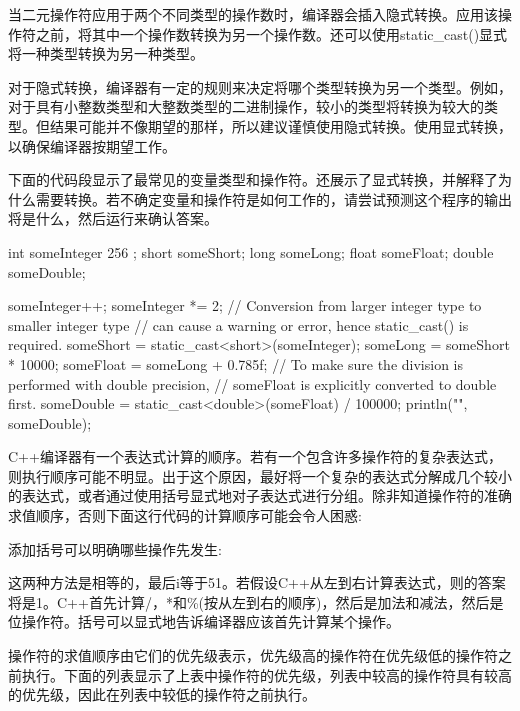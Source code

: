当二元操作符应用于两个不同类型的操作数时，编译器会插入隐式转换。应用该操作符之前，将其中一个操作数转换为另一个操作数。还可以使用static\_cast()显式将一种类型转换为另一种类型。

对于隐式转换，编译器有一定的规则来决定将哪个类型转换为另一个类型。例如，对于具有小整数类型和大整数类型的二进制操作，较小的类型将转换为较大的类型。但结果可能并不像期望的那样，所以建议谨慎使用隐式转换。使用显式转换，以确保编译器按期望工作。

下面的代码段显示了最常见的变量类型和操作符。还展示了显式转换，并解释了为什么需要转换。若不确定变量和操作符是如何工作的，请尝试预测这个程序的输出将是什么，然后运行来确认答案。

\begin{cpp}
int someInteger { 256 };
short someShort;
long someLong;
float someFloat;
double someDouble;

someInteger++;
someInteger *= 2;
// Conversion from larger integer type to smaller integer type
// can cause a warning or error, hence static_cast() is required.
someShort = static_cast<short>(someInteger);
someLong = someShort * 10000;
someFloat = someLong + 0.785f;
// To make sure the division is performed with double precision,
// someFloat is explicitly converted to double first.
someDouble = static_cast<double>(someFloat) / 100000;
println("{}", someDouble);
\end{cpp}

C++编译器有一个表达式计算的顺序。若有一个包含许多操作符的复杂表达式，则执行顺序可能不明显。出于这个原因，最好将一个复杂的表达式分解成几个较小的表达式，或者通过使用括号显式地对子表达式进行分组。除非知道操作符的准确求值顺序，否则下面这行代码的计算顺序可能会令人困惑:


添加括号可以明确哪些操作先发生:


这两种方法是相等的，最后i等于51。若假设C++从左到右计算表达式，则的答案将是1。C++首先计算/，*和\%(按从左到右的顺序)，然后是加法和减法，然后是位操作符。括号可以显式地告诉编译器应该首先计算某个操作。

操作符的求值顺序由它们的优先级表示，优先级高的操作符在优先级低的操作符之前执行。下面的列表显示了上表中操作符的优先级，列表中较高的操作符具有较高的优先级，因此在列表中较低的操作符之前执行。

